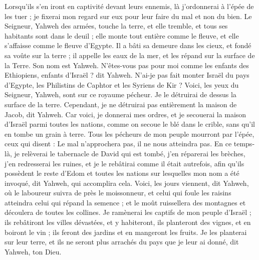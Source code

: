 \begin{multicols}{2}
Lorsqu'ils s'en iront en captivité devant leurs ennemis, là j’ordonnerai à l’épée de les tuer ; je fixerai mon regard sur eux pour leur faire du mal et non du bien.
Le Seigneur, Yahweh des armées, touche la terre, et elle tremble, et tous ses habitants sont dans le deuil ; elle monte tout entière comme le fleuve, et elle s’affaisse comme le fleuve d'Egypte.
Il a bâti sa demeure dans les cieux, et fondé sa voûte sur la terre ; il appelle les eaux de la mer, et les répand sur la surface de la Terre. Son nom est Yahweh.
N'êtes-vous pas pour moi comme les enfants des Ethiopiens, enfants d'Israël ? dit Yahweh. N'ai-je pas fait monter Israël du pays d'Egypte, les Philistins de Caphtor et les Syriens de Kir ?
Voici, les yeux du Seigneur, Yahweh, sont sur ce royaume pécheur. Je le détruirai de dessus la surface de la terre. Cependant, je ne détruirai pas entièrement la maison de Jacob, dit Yahweh.
Car voici, je donnerai mes ordres, et je secouerai la maison d'Israël parmi toutes les nations, comme on secoue le blé dans le crible, sans qu'il en tombe un grain à terre.
Tous les pécheurs de mon peuple mourront par l'épée, ceux qui disent : Le mal n'approchera pas, il ne nous atteindra pas.
En ce temps-là, je relèverai le tabernacle de David qui est tombé, j’en réparerai les brèches, j’en redresserai les ruines, et je le rebâtirai comme il était autrefois,
afin qu'ils possèdent le reste d’Edom et toutes les nations sur lesquelles mon nom a été invoqué, dit Yahweh, qui accomplira cela.
Voici, les jours viennent, dit Yahweh, où le laboureur suivra de près le moissonneur, et celui qui foule les raisins atteindra celui qui répand la semence ; et le moût ruissellera des montagnes et découlera de toutes les collines.
Je ramènerai les captifs de mon peuple d'Israël ; ils rebâtiront les villes dévastées, et y habiteront, ils planteront des vignes, et en boiront le vin ; ils feront des jardins et en mangeront les fruits.
Je les planterai sur leur terre, et ils ne seront plus arrachés du pays que je leur ai donné, dit Yahweh, ton Dieu.
\PPE{}
\end{multicols}

